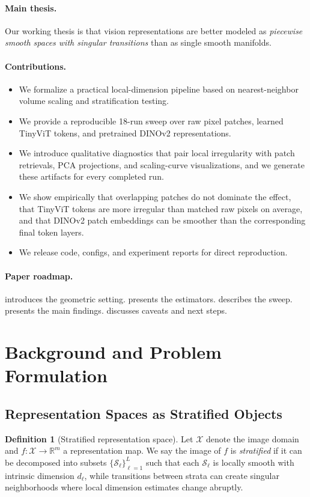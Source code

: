 \documentclass{article}
\newcommand{\R}{\mathbb{R}}
\theoremstyle{definition}
\newtheorem{definition}{Definition}
\theoremstyle{plain}
\theoremstyle{remark}
\begin{document}
\paragraph{Main thesis.}
Our working thesis is that vision representations are better modeled as \emph{piecewise smooth spaces with singular transitions} than as single smooth manifolds.

\paragraph{Contributions.}
\begin{itemize}[leftmargin=1.5em]
\item We formalize a practical local-dimension pipeline based on nearest-neighbor volume scaling and stratification testing.
\item We provide a reproducible 18-run sweep over raw pixel patches, learned TinyViT tokens, and pretrained DINOv2 representations.
\item We introduce qualitative diagnostics that pair local irregularity with patch retrievals, PCA projections, and scaling-curve visualizations, and we generate these artifacts for every completed run.
\item We show empirically that overlapping patches do not dominate the effect, that TinyViT tokens are more irregular than matched raw pixels on average, and that DINOv2 patch embeddings can be smoother than the corresponding final token layers.
\item We release code, configs, and experiment reports for direct reproduction.
\end{itemize}

\paragraph{Paper roadmap.}
 introduces the geometric setting.  presents the estimators.  describes the sweep.  presents the main findings.  discusses caveats and next steps.

\section{Background and Problem Formulation}
\label{sec:background}

\subsection{Representation Spaces as Stratified Objects}
\begin{definition}[Stratified representation space]
Let $\mathcal{X}$ denote the image domain and $f:\mathcal{X}\to\R^m$ a representation map. We say the image of $f$ is \emph{stratified} if it can be decomposed into subsets $\{\mathcal{S}_\ell\}_{\ell=1}^L$ such that each $\mathcal{S}_\ell$ is locally smooth with intrinsic dimension $d_\ell$, while transitions between strata can create singular neighborhoods where local dimension estimates change abruptly.
\end{definition}
\end{document}

